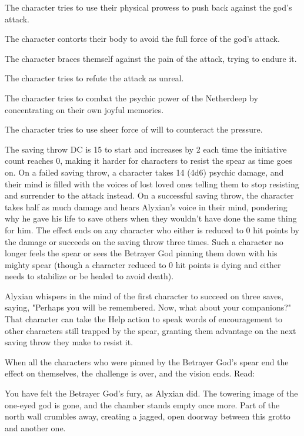 \documentclass[10pt,a4paper,twoside,twocolumn,openany,nodeprecatedcode]{dndbook}
\begin{document}
\begin{description}[nolistsep]
\item[Strength.]
The character tries to use their physical prowess to push back against the god's attack.
\item[Dexterity.]
The character contorts their body to avoid the full force of the god's attack.
\item[Constitution.]
The character braces themself against the pain of the attack, trying to endure it.
\item[Intelligence.]
The character tries to refute the attack as unreal.
\item[Wisdom.]
The character tries to combat the psychic power of the Netherdeep by concentrating on their own joyful memories.
\item[Charisma.]
The character tries to use sheer force of will to counteract the pressure.
\end{description}

The saving throw DC is 15 to start and increases by 2 each time the initiative count reaches 0, making it harder for characters to resist the spear as time goes on. On a failed saving throw, a character takes 14 (4d6) psychic damage, and their mind is filled with the voices of lost loved ones telling them to stop resisting and surrender to the attack instead. On a successful saving throw, the character takes half as much damage and hears Alyxian's voice in their mind, pondering why he gave his life to save others when they wouldn't have done the same thing for him. The effect ends on any character who either is reduced to 0 hit points by the damage or succeeds on the saving throw three times. Such a character no longer feels the spear or sees the Betrayer God pinning them down with his mighty spear (though a character reduced to 0 hit points is dying and either needs to stabilize or be healed to avoid death).

Alyxian whispers in the mind of the first character to succeed on three saves, saying, "Perhaps you will be remembered. Now, what about your companions?" That character can take the Help action to speak words of encouragement to other characters still trapped by the spear, granting them advantage on the next saving throw they make to resist it.

When all the characters who were pinned by the Betrayer God's spear end the effect on themselves, the challenge is over, and the vision ends. Read:

\begin{DndReadAloud}{}
You have felt the Betrayer God's fury, as Alyxian did. The towering image of the one-eyed god is gone, and the chamber stands empty once more. Part of the north wall crumbles away, creating a jagged, open doorway between this grotto and another one.

\end{DndReadAloud}
\end{document}
